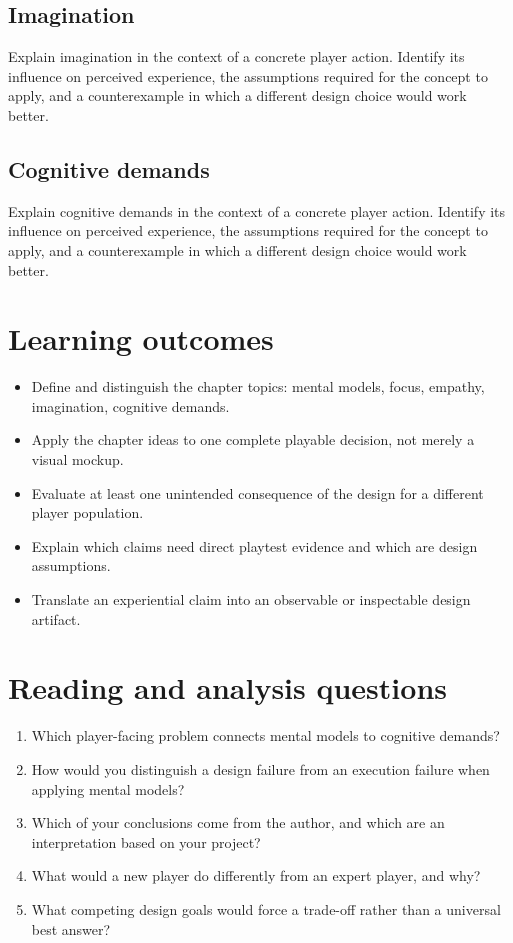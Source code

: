\documentclass[11pt]{article}
\begin{document}
\subsection{Imagination}
Explain imagination in the context of a concrete player action. Identify its influence on perceived experience, the assumptions required for the concept to apply, and a counterexample in which a different design choice would work better.


\subsection{Cognitive demands}
Explain cognitive demands in the context of a concrete player action. Identify its influence on perceived experience, the assumptions required for the concept to apply, and a counterexample in which a different design choice would work better.


\section{Learning outcomes}
\begin{itemize}
\item Define and distinguish the chapter topics: mental models, focus, empathy, imagination, cognitive demands.
\item Apply the chapter ideas to one complete playable decision, not merely a visual mockup.
\item Evaluate at least one unintended consequence of the design for a different player population.
\item Explain which claims need direct playtest evidence and which are design assumptions.
\item Translate an experiential claim into an observable or inspectable design artifact.
\end{itemize}

\section{Reading and analysis questions}
\begin{enumerate}
\item Which player-facing problem connects mental models to cognitive demands?
\item How would you distinguish a design failure from an execution failure when applying mental models?
\item Which of your conclusions come from the author, and which are an interpretation based on your project?
\item What would a new player do differently from an expert player, and why?
\item What competing design goals would force a trade-off rather than a universal best answer?
\end{enumerate}
\end{document}
